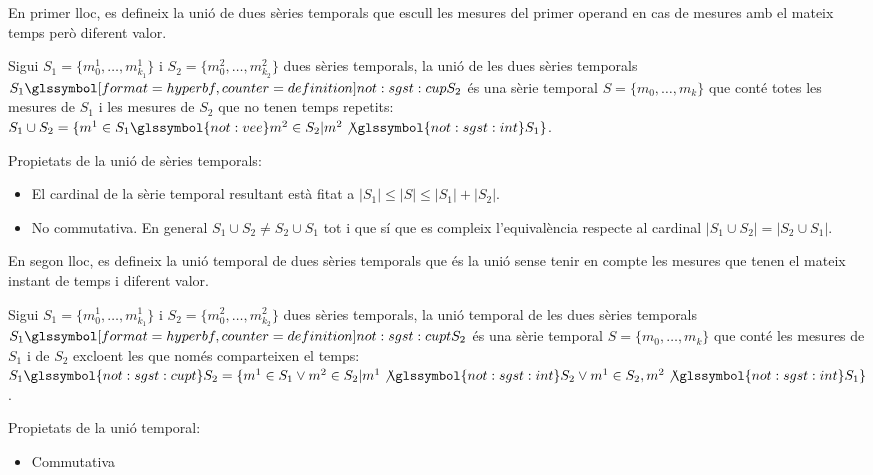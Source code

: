 En primer lloc, es defineix la unió de dues sèries temporals que
escull les mesures del primer operand en cas de mesures amb el mateix
temps però diferent valor.
\begin{definition}[Unió]
  Sigui $S_1=\{m_0^1, \dotsc, m_{k_1}^1\}$ i $S_2=\{m_0^2, \dotsc,
  m_{k_2}^2\}$ dues sèries temporals, la unió de les dues sèries
  temporals $S_1 \glssymboldef{not:sgst:cup} S_2$ és una sèrie
  temporal $S=\{m_0, \dotsc, m_k\}$ que conté totes les mesures de
  $S_1$ i les mesures de $S_2$ que no tenen temps repetits: $S_1 \cup
  S_2 = \{m^1 \in S_1 \glssymbol{not:vee} m^2 \in S_2 | m^2
  \not\glssymbol{not:sgst:int} S_1 \}$.
\end{definition}

Propietats de la unió de sèries temporals:
\begin{itemize}
\item El cardinal de la sèrie temporal resultant està fitat a
  $|S_1| \leq |S| \leq |S_1| + |S_2|$. 
\item No commutativa. En general
  $S_1\cup S_2 \neq S_2\cup S_1$ tot i que sí que es compleix
  l'equivalència respecte al cardinal $|S_1 \cup S_2| = |S_2\cup S_1|$.
\end{itemize}

En segon lloc, es defineix la unió temporal de dues sèries temporals
que és la unió sense tenir en compte les mesures que tenen el mateix
instant de temps i diferent valor.
\begin{definition}
  Sigui $S_1=\{m_0^1, \dotsc, m_{k_1}^1\}$ i $S_2=\{m_0^2, \dotsc,
  m_{k_2}^2\}$ dues sèries temporals, la unió temporal de les dues
  sèries temporals $S_1 \glssymboldef{not:sgst:cupt} S_2$ és una sèrie
  temporal $S=\{m_0, \dotsc, m_k\}$ que conté les mesures de $S_1$ i
  de $S_2$ excloent les que només comparteixen el temps: $S_1
  \glssymbol{not:sgst:cupt} S_2 = \{ m^1 \in S_1 \vee m^2 \in S_2 |
  m^1 \not\glssymbol{not:sgst:int} S_2 \vee m^1 \in S_2, m^2
  \not\glssymbol{not:sgst:int} S_1 \}$.
\end{definition}


Propietats de la unió temporal:
\begin{itemize}
\item Commutativa
\end{itemize}





